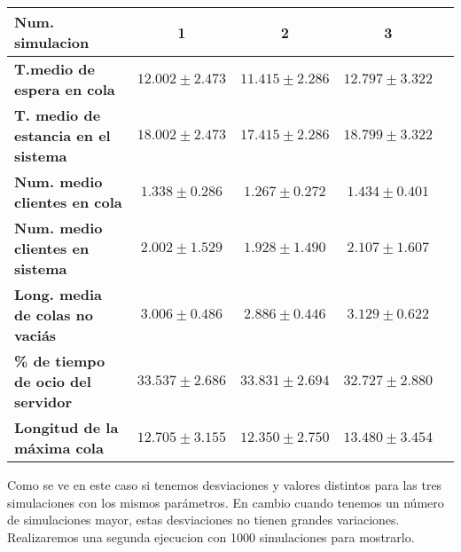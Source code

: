 \documentclass[]{article}
\begin{document}
\begin{table}[H]
	\begin{center}
		\begin{tabularx}{1\textwidth}{|X|c|c|c|c|}
			\hline
			\textbf{Num. simulacion} &  1 & 2 & 3\\
			\hline \hline
			\textbf{T.medio de espera en cola}& $12.002\pm2.473$ & $11.415\pm2.286$ & $12.797\pm3.322$ \\ \hline
			\textbf{T. medio de estancia en el sistema}& $18.002\pm2.473$ & $17.415\pm2.286$ & $18.799\pm3.322$ \\ \hline
			\textbf{Num. medio clientes en cola}& $1.338\pm0.286$ & $1.267\pm0.272$& $1.434\pm0.401$ \\  \hline
			\textbf{Num. medio clientes en sistema}& $2.002\pm1.529$ & $1.928\pm1.490$& $2.107\pm1.607$ \\ \hline
			\textbf{Long. media de colas no vaciás}& $3.006\pm0.486$ & $2.886\pm0.446$& $3.129\pm0.622$ \\ \hline
			\textbf{\% de tiempo de ocio del servidor}& $33.537\pm2.686$ & $33.831\pm2.694$ & $32.727\pm2.880$ \\ \hline
			\textbf{Longitud de la máxima cola}& $12.705\pm3.155$  &$12.350\pm2.750$& $13.480\pm3.454$ \\ \hline
		\end{tabularx}
		
	\end{center}
\end{table}

Como se ve en este caso si tenemos desviaciones y valores distintos para las tres simulaciones con los mismos parámetros. En cambio cuando tenemos un número de simulaciones mayor, estas desviaciones no tienen grandes variaciones. Realizaremos una segunda ejecucion con 1000 simulaciones para mostrarlo.
\end{document}
